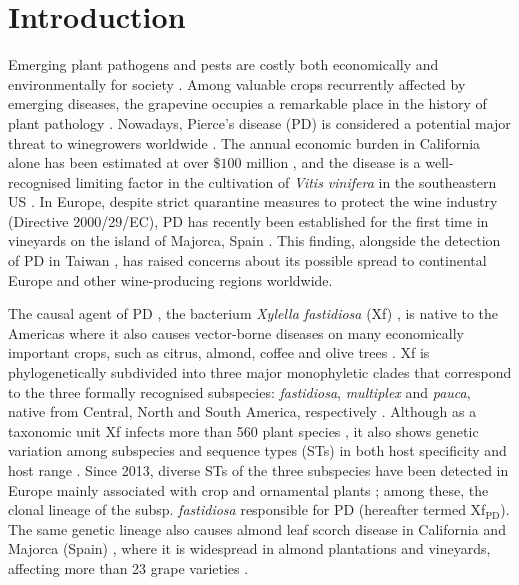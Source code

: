 \section{Introduction}
Emerging plant pathogens and pests are costly both economically and
environmentally for society \cite{Carvajal2019,
    Mooney2001,Pimentel2000,Spence2020}. Among valuable crops recurrently
affected
by emerging diseases, the grapevine occupies a remarkable place in the history
of plant pathology \cite{Borkarbook, Brewer2010, Rouxel2014, Tello2019}.
Nowadays, Pierce's disease (PD) is considered a potential major threat to
winegrowers worldwide \cite{Hopkins2002}. The annual economic burden in
California alone has been estimated at over $\$ 100$ million \cite{Tumber2014},
and the disease is a well-recognised limiting factor in the cultivation of
\textit{Vitis vinifera} in the southeastern US \cite{Hopkins2002}. In Europe,
despite strict quarantine measures to protect the wine industry (Directive
2000/29/EC), PD has recently been established for the first time in vineyards
on the island of Majorca, Spain \cite{Gomila2019, Moralejo2019}. This finding,
alongside the detection of PD in Taiwan \cite{Su2013}, has raised concerns
about its possible spread to continental Europe and other wine-producing
regions worldwide.

The causal agent of PD \cite{Davis1978}, the bacterium \textit{Xylella
    fastidiosa} (Xf) \cite{Wells1987}, is native to the Americas where it also
causes vector-borne diseases on many economically important crops, such as
citrus, almond, coffee and olive trees \cite{Almeida2015, Almeida2019}. Xf is
phylogenetically subdivided into three major monophyletic clades that
correspond to the three formally recognised subspecies: \textit{fastidiosa},
\textit{multiplex} and \textit{pauca}, native from Central, North and South
America, respectively \cite{Sicard2018,Vanhove2019}. Although as a taxonomic
unit Xf infects more than 560 plant species \cite{Delbianco2019}, it also shows
genetic variation among subspecies and sequence types (STs) in both host
specificity and host range \cite{Nunney2019}. Since 2013, diverse STs of the
three subspecies have been detected in Europe mainly associated with crop and
ornamental plants \cite{Denance2017, Olmo2017, Saponari2013}; among these, the
clonal lineage of the subsp. \textit{fastidiosa} responsible for PD (hereafter
termed Xf$_{\textrm{PD}}$). The same genetic lineage also causes almond leaf
scorch disease in California \cite{Almeida2003} and Majorca (Spain)
\cite{Moralejo2020}, where it is widespread in almond plantations and
vineyards, affecting more than 23 grape varieties \cite{Moralejo2019}.

